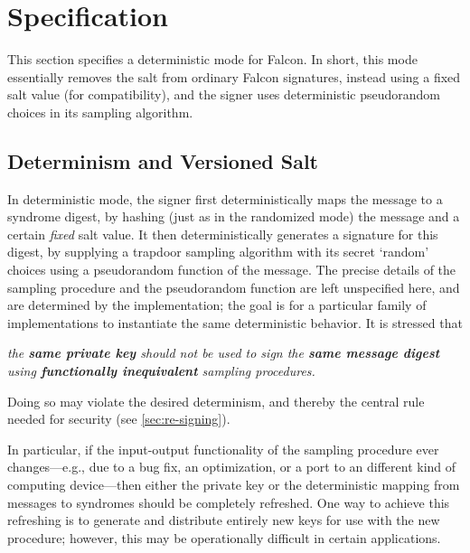 \documentclass[11pt]{article}
\begin{document}
\section{Specification}
\label{sec:specification}

This section specifies a deterministic mode for Falcon. In short, this
mode essentially removes the salt from ordinary Falcon signatures,
instead using a fixed salt value (for compatibility), and the signer
uses deterministic pseudorandom choices in its sampling algorithm.

\subsection{Determinism and Versioned Salt}
\label{sec:versioned-salt}

In deterministic mode, the signer first deterministically maps the
message to a syndrome digest, by hashing (just as in the randomized
mode) the message and a certain \emph{fixed} salt value. It then
deterministically generates a signature for this digest, by supplying
a trapdoor sampling algorithm with its secret `random' choices using a
pseudorandom function of the message. The precise details of the
sampling procedure and the pseudorandom function are left unspecified
here, and are determined by the implementation; the goal is for a
particular family of implementations to instantiate the same
deterministic behavior. It is stressed that
\begin{center}
  \emph{the \textbf{same private key} should not be used to sign the
    \textbf{same message digest}\\using \textbf{functionally
      inequivalent} sampling procedures.}
\end{center}
Doing so may violate the desired determinism, and thereby the central
rule needed for security (see \cref{sec:re-signing}).

In particular, if the input-output functionality of the sampling
procedure ever changes---e.g., due to a bug fix, an optimization, or a
port to an different kind of computing device---then either the
private key or the deterministic mapping from messages to syndromes
should be completely refreshed.  One way to achieve this refreshing is
to generate and distribute entirely new keys for use with the new
procedure; however, this may be operationally difficult in certain
applications.
\end{document}
